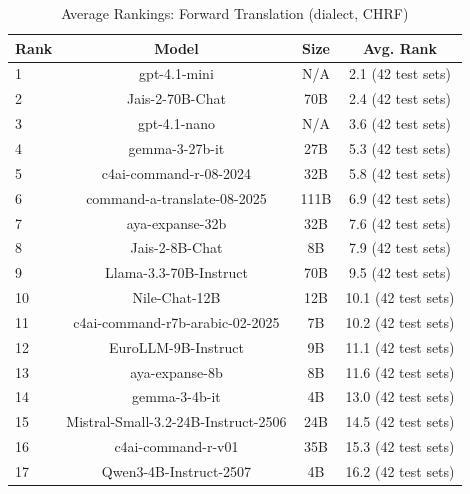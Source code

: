 \begin{table}[htbp]
\centering
\caption{Average Rankings: Forward Translation (dialect, CHRF)}
\label{tab:avg_rankings_chrf_dialect}
\begin{tabular}{l@{\hspace{3pt}}c@{\hspace{3pt}}c@{\hspace{3pt}}c}
\toprule
Rank & Model & Size & Avg. Rank \\
\midrule
1 & gpt-4.1-mini & N/A & 2.1 (42 test sets) \\
2 & Jais-2-70B-Chat & 70B & 2.4 (42 test sets) \\
3 & gpt-4.1-nano & N/A & 3.6 (42 test sets) \\
4 & gemma-3-27b-it & 27B & 5.3 (42 test sets) \\
5 & c4ai-command-r-08-2024 & 32B & 5.8 (42 test sets) \\
6 & command-a-translate-08-2025 & 111B & 6.9 (42 test sets) \\
7 & aya-expanse-32b & 32B & 7.6 (42 test sets) \\
8 & Jais-2-8B-Chat & 8B & 7.9 (42 test sets) \\
9 & Llama-3.3-70B-Instruct & 70B & 9.5 (42 test sets) \\
10 & Nile-Chat-12B & 12B & 10.1 (42 test sets) \\
11 & c4ai-command-r7b-arabic-02-2025 & 7B & 10.2 (42 test sets) \\
12 & EuroLLM-9B-Instruct & 9B & 11.1 (42 test sets) \\
13 & aya-expanse-8b & 8B & 11.6 (42 test sets) \\
14 & gemma-3-4b-it & 4B & 13.0 (42 test sets) \\
15 & Mistral-Small-3.2-24B-Instruct-2506 & 24B & 14.5 (42 test sets) \\
16 & c4ai-command-r-v01 & 35B & 15.3 (42 test sets) \\
17 & Qwen3-4B-Instruct-2507 & 4B & 16.2 (42 test sets) \\
\bottomrule
\end{tabular}
\end{table}